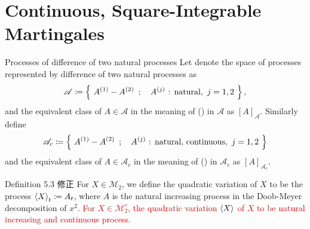 \section{Continuous, Square-Integrable Martingales}
	\begin{itembox}[l]{Processes of difference of two natural processes}
		Let denote the space of processes represented by difference of two natural processes as
		\begin{align}
			\mathscr{A} \coloneqq \Set{A^{(1)} - A^{(2)}}{A^{(j)} \ \mbox{: natural},\ j=1,2},
		\end{align}
		and the equivalent class of $A \in \mathscr{A}$ in the meaning of
		() in $\mathscr{A}$ as
		$[A]_{\mathscr{A}}$. Similarly define
		\begin{align}
			\mathscr{A}_c \coloneqq \Set{A^{(1)} - A^{(2)}}{A^{(j)} \ \mbox{: natural, continuous},\ j=1,2}
		\end{align}
		and the equivalent class of $A \in \mathscr{A}_c$ in the meaning of
		() in $\mathscr{A}_c$ as
		$[A]_{\mathscr{A}_c}$.
	\end{itembox}
	
	\begin{itembox}[l]{Definition 5.3 修正}
		For $X \in \mathscr{M}_2$, we define the quadratic variation of $X$ to be the process $\inprod<X>_t \coloneqq A_t$,
		where $A$ is the natural increasing process in the Doob-Meyer decomposition of $x^2$.
		\textcolor{red}{For $X \in \mathscr{M}_2^c$, the quadratic variation $\inprod<X>$ of $X$ 
		to be natural increasing and continuous process.}
	\end{itembox}
	
